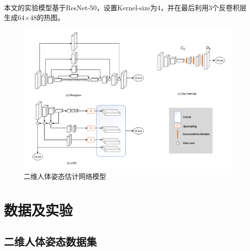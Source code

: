 本文的实验模型基于ResNet-50，设置Kernel-size为4，并在最后利用3个反卷积层生成64×48的热图。
\begin{figure}[h]
	\centering
	\includegraphics[scale=0.4]{figures/19.png}
	\caption{二维人体姿态估计网络模型}
	\label{fig:f19}
\end{figure}



\section{数据及实验}
\subsection{二维人体姿态数据集}{}


